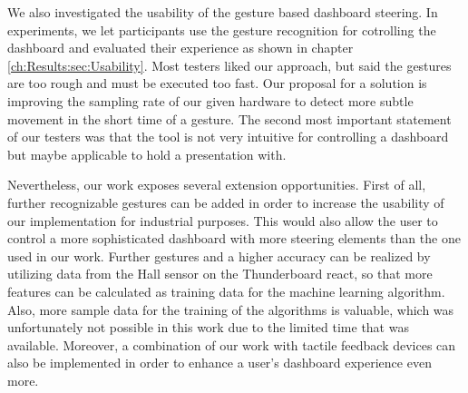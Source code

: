 We also investigated the usability of the gesture based dashboard steering. 
In experiments, we let participants use the gesture recognition for cotrolling the dashboard and evaluated their experience as shown in chapter \ref{ch:Results:sec:Usability}.
Most testers liked our approach, but said the gestures are too rough and must be executed too fast.
Our proposal for a solution is improving the sampling rate of our given hardware to detect more subtle movement in the short time of a gesture.
The second most important statement of our testers was that the tool is not very intuitive for controlling a dashboard but maybe applicable to hold a presentation with.

Nevertheless, our work exposes several extension opportunities. 
First of all, further recognizable gestures can be added in order to increase the usability of our implementation for industrial purposes. 
This would also allow the user to control a more sophisticated dashboard with more steering elements than the one used in our work.
Further gestures and a higher accuracy can be realized by utilizing data from the Hall sensor on the Thunderboard react, so that more features can be calculated as training data for the machine learning algorithm. 
Also, more sample data for the training of the algorithms is valuable, which was unfortunately not possible in this work due to the limited time that was available. 
Moreover, a combination of our work with tactile feedback devices can also be implemented in order to enhance a user’s dashboard experience even more. 


